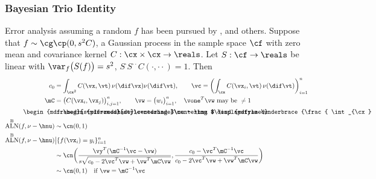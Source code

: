 \documentclass[10pt,compress,xcolor={usenames,dvipsnames}]{beamer} %
\DeclareMathOperator{\algn}{ALN}
\DeclareMathOperator{\disc}{DSC}
\DeclareMathOperator{\Var}{VAR}
\DeclareMathOperator{\GP}{\cg\cp}
\newcommand{\Ba}{\text{B}}
\newcommand{\redroundmathbox}[1]{\parbox{\widthof{$#1$\hspace{1em}}}
	{\begin{mdframed}[style=redshade]\centering $#1$ \end{mdframed}}}
\begin{document}
\begin{frame}
	\frametitle{Bayesian Trio Identity}
	\vspace*{-4ex}
	Error analysis assuming a random $f$ has been pursued by \cite{Dia88a}, \cite{Rit00a}  and others.
	Suppose that $f \sim \GP (0, s^2C)$,  a Gaussian process in the sample space $\cf$ with zero mean and covariance kernel $C:\cx \times \cx \to \reals$.  Let $S : \cf \to \reals$ be linear with
	$ \var_{f}\bigl(S(f)\bigr)= s^2$, $S^{\cdot}S^{\cdot\cdot}C(\cdot,\cdot\cdot) =  1$.
	Then 
	\vspace{-1ex}
	\begin{align*}
	c_0 & = \int_{\cx^2} C(\vx,\vt) \, \nu(\dif \vx) \nu(\dif \vt), \qquad \vc = \biggl( \int_{\cx} C(\vx_i,\vt) \,\nu(\dif \vt) \biggr)_{i=1}^n \\
	\mC & = \bigl( C(\vx_i,\vx_j) \bigr)_{i,j=1}^n, \qquad \vw = \bigl(w_i \bigr)_{i=1}^n,  \quad \vone^T \vw \text{ may be } \ne 1\\
	\redroundmathbox{\mu - \hmu} 
	& =  \redroundmathbox{\displaystyle%
		\underbrace{\frac{ \int_{\cx} f(\vx) \, (\nu - \hnu)(\dif\vx)}{s \sqrt{c_0 - 2 \vc^T \vw + \vw^T \mC \vw}}}_{\textstyle \algn^\Ba(f,\nu - \hnu)} \, 
		\underbrace{\sqrt{c_0 - 2 \vc^T \vw + \vw^T \mC \vw}}_{\textstyle\disc^\Ba(\nu - \hnu)} \, \underbrace{s}_{\textstyle\Var^\Ba(f)}}\\
	\algn^\Ba(f,\nu - \hnu) &\sim \cn ( 0, 1 ) \\
	\algn^\Ba(f,\nu - \hnu) & \big \vert \{f(\vx_i )= y_i\}_{i=1}^n \\
	& \sim \cn \biggl( \frac{\vy^T (\mC^{-1}\vc - \vw)}{s\sqrt{c_0 - 2 \vc^T \vw + \vw^T \mC \vw}}, \frac{c_0 - \vc ^T \mC^{-1} \vc}{c_0 - 2 \vc^T \vw + \vw^T \mC \vw} \biggr) \\
	& \sim \cn (0,1) \quad \text{if } \vw = \mC^{-1}\vc 
	\end{align*}	
\end{frame}
\end{document}
